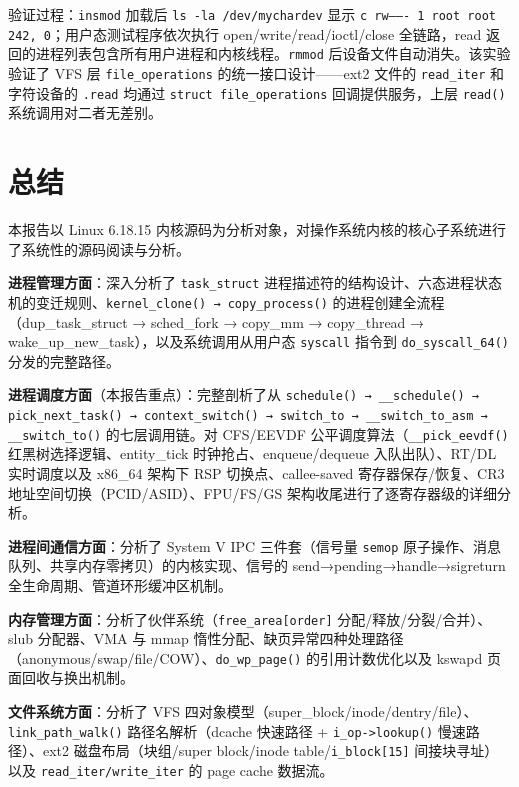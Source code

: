 \documentclass[a4paper]{article}
\begin{document}
验证过程：\texttt{insmod} 加载后 \texttt{ls -la /dev/mychardev} 显示 \texttt{c rw------- 1 root root 242, 0}；用户态测试程序依次执行 open/write/read/ioctl/close 全链路，read 返回的进程列表包含所有用户进程和内核线程。\texttt{rmmod} 后设备文件自动消失。该实验验证了 VFS 层 \texttt{file\_operations} 的统一接口设计——ext2 文件的 \texttt{read\_iter} 和字符设备的 \texttt{.read} 均通过 \texttt{struct file\_operations} 回调提供服务，上层 \texttt{read()} 系统调用对二者无差别。

\section{总结} \label{sec:conclusion}

本报告以 Linux 6.18.15 内核源码为分析对象，对操作系统内核的核心子系统进行了系统性的源码阅读与分析。

\textbf{进程管理方面}：深入分析了 \texttt{task\_struct} 进程描述符的结构设计、六态进程状态机的变迁规则、\texttt{kernel\_clone() → copy\_process()} 的进程创建全流程（dup\_task\_struct → sched\_fork → copy\_mm → copy\_thread → wake\_up\_new\_task），以及系统调用从用户态 \texttt{syscall} 指令到 \texttt{do\_syscall\_64()} 分发的完整路径。

\textbf{进程调度方面}（本报告重点）：完整剖析了从 \texttt{schedule() → \_\_schedule() → pick\_next\_task() → context\_switch() → switch\_to → \_\_switch\_to\_asm → \_\_switch\_to()} 的七层调用链。对 CFS/EEVDF 公平调度算法（\texttt{\_\_pick\_eevdf()} 红黑树选择逻辑、entity\_tick 时钟抢占、enqueue/dequeue 入队出队）、RT/DL 实时调度以及 x86\_64 架构下 RSP 切换点、callee-saved 寄存器保存/恢复、CR3 地址空间切换（PCID/ASID）、FPU/FS/GS 架构收尾进行了逐寄存器级的详细分析。

\textbf{进程间通信方面}：分析了 System V IPC 三件套（信号量 \texttt{semop} 原子操作、消息队列、共享内存零拷贝）的内核实现、信号的 send→pending→handle→sigreturn 全生命周期、管道环形缓冲区机制。

\textbf{内存管理方面}：分析了伙伴系统（\texttt{free\_area[order]} 分配/释放/分裂/合并）、slub 分配器、VMA 与 mmap 惰性分配、缺页异常四种处理路径（anonymous/swap/file/COW）、\texttt{do\_wp\_page()} 的引用计数优化以及 kswapd 页面回收与换出机制。

\textbf{文件系统方面}：分析了 VFS 四对象模型（super\_block/inode/dentry/file）、\texttt{link\_path\_walk()} 路径名解析（dcache 快速路径 + \texttt{i\_op->lookup()} 慢速路径）、ext2 磁盘布局（块组/super block/inode table/\texttt{i\_block[15]} 间接块寻址）以及 \texttt{read\_iter/write\_iter} 的 page cache 数据流。
\end{document}
